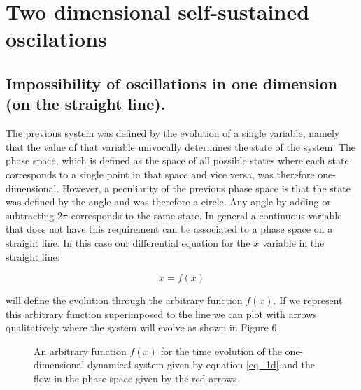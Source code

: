 \documentclass{article}
\begin{document}
\section{Two dimensional self-sustained oscilations}

\subsection{Impossibility of oscillations in one dimension (on the straight line).}

The previous system was defined by the evolution of a single variable, namely that the value of that variable univocally determines the state of the system.
The phase space, which is defined as the space of all possible states where each state corresponds to a single point in that space and vice versa, was therefore one-dimensional. 
However, a peculiarity of the previous phase space is that the state was defined by the angle and was therefore a circle. 
Any angle by adding or subtracting $2\pi$ corresponds to the same state. 
In general a continuous variable that does not have this requirement can be associated to a phase space on a straight line.
In this case our differential equation for the $x$ variable in the straight line:

\begin{equation}
    \dot x = f(x)
    \label{eq_1d}
\end{equation}

will define the evolution through the arbitrary function $f(x)$. 
If we represent this arbitrary function superimposed to the line we can plot with arrows qualitatively where the system will evolve as shown in Figure 6.

\begin{figure}
    \centering
    \caption{An arbitrary function $f(x)$ for the time evolution of the one-dimensional dynamical system given by equation \ref{eq_1d} and the flow in the phase space given by the red arrows} 
    \label{fig_onedimension}
\end{figure}
\end{document}

